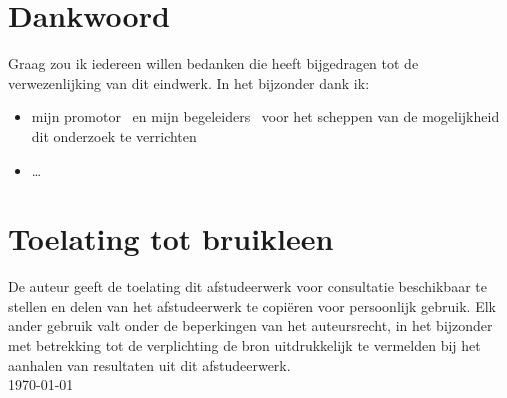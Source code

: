\newpage
\thispagestyle{plain}

\section*{Dankwoord}
Graag zou ik iedereen willen bedanken die heeft bijgedragen tot de
verwezenlijking van dit eindwerk. In het bijzonder dank ik:
\begin{itemize}
  \item mijn promotor \promotor\ en mijn begeleiders \begeleider\ voor het scheppen van de
mogelijkheid dit onderzoek te verrichten
  \item \ldots
\end{itemize}
\vfill


\section*{Toelating tot bruikleen}
De auteur geeft de toelating dit afstudeerwerk voor consultatie 
beschikbaar te stellen en delen van het afstudeerwerk te copi\"eren voor
persoonlijk gebruik. Elk ander gebruik valt onder de beperkingen van het 
auteursrecht, in het bijzonder met betrekking tot de verplichting de bron 
uitdrukkelijk te vermelden bij het aanhalen van resultaten uit dit 
afstudeerwerk.
\\[1cm]
\auteur\hfill \today
\\[1cm]